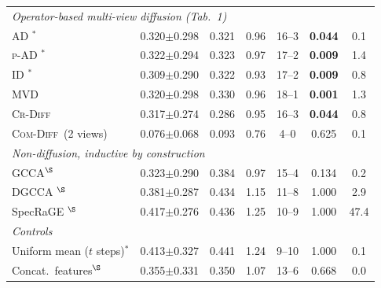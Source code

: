 \begin{table}[H]
\begin{tabular}{l c c c c c c}
\midrule
\multicolumn{7}{l}{\emph{Operator-based multi-view diffusion (Tab.~1)}}\\
AD \cite{katz2019}$^{*}$ & 0.320$\pm$0.298 & 0.321 & 0.96 & 16--3 & \textbf{0.044} & 0.1\\
\textsc{p}-AD \cite{kuchroo2022}$^{*}$ & 0.322$\pm$0.294 & 0.323 & 0.97 & 17--2 & \textbf{0.009} & 1.4\\
ID \cite{kuchroo2022}$^{*}$ & 0.309$\pm$0.290 & 0.322 & 0.93 & 17--2 & \textbf{0.009} & 0.8\\
MVD \cite{lindenbaum2020} & 0.320$\pm$0.298 & 0.330 & 0.96 & 18--1 & \textbf{0.001} & 1.3\\
\textsc{Cr-Diff} \cite{wang2012} & 0.317$\pm$0.274 & 0.286 & 0.95 & 16--3 & \textbf{0.044} & 0.8\\
\textsc{Com-Diff} \cite{shnitzer2018}\,\footnotesize(2 views) & 0.076$\pm$0.068 & 0.093 & 0.76 & 4--0 & 0.625 & 0.1\\
\midrule
\multicolumn{7}{l}{\emph{Non-diffusion, inductive by construction}}\\
GCCA$^{\S}$ & 0.323$\pm$0.290 & 0.384 & 0.97 & 15--4 & 0.134 & 0.2\\
DGCCA \cite{benton2017}$^{\S}$ & 0.381$\pm$0.287 & 0.434 & 1.15 & 11--8 & 1.000 & 2.9\\
SpecRaGE \cite{yacobi2025}$^{\S}$ & 0.417$\pm$0.276 & 0.436 & 1.25 & 10--9 & 1.000 & 47.4\\
\midrule
\multicolumn{7}{l}{\emph{Controls}}\\
Uniform mean ($t$ steps)$^{*}$ & 0.413$\pm$0.327 & 0.441 & 1.24 & 9--10 & 1.000 & 0.1\\
Concat.\ features$^{\S}$ & 0.355$\pm$0.331 & 0.350 & 1.07 & 13--6 & 0.668 & 0.0\\
\bottomrule
\end{tabular}
\end{table}
